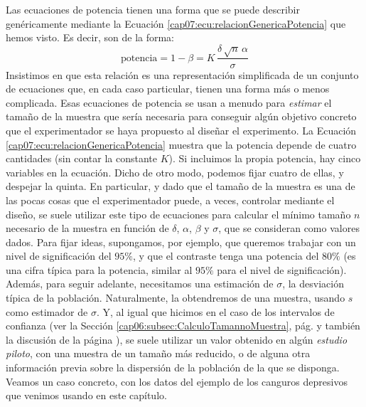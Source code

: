 Las ecuaciones de potencia tienen una forma que se puede describir genéricamente mediante la Ecuación \ref{cap07:ecu:relacionGenericaPotencia} que hemos visto. Es decir, son de la forma:
\[\mbox{potencia}=1-\beta = K\, \dfrac{\delta\,\sqrt{n}\,\alpha}{\sigma}\]
Insistimos en que esta relación es una representación simplificada de un conjunto de ecuaciones que, en cada caso particular, tienen una forma más o menos complicada. Esas ecuaciones de potencia se usan a menudo para {\em estimar} el tamaño de la muestra que sería necesaria para conseguir algún objetivo concreto que el experimentador se haya propuesto al diseñar el experimento. La Ecuación \ref{cap07:ecu:relacionGenericaPotencia} muestra que la potencia depende de cuatro cantidades (sin contar la constante $K$). Si incluimos la propia potencia, hay cinco variables en la ecuación. Dicho de otro modo, podemos fijar cuatro de ellas, y despejar la quinta. En particular, y dado que el tamaño de la muestra es una de las pocas cosas que el experimentador puede, a veces, controlar mediante el diseño, se suele utilizar este tipo de ecuaciones para calcular el mínimo tamaño $n$ necesario de la muestra en función de $\delta$, $\alpha$, $\beta$ y $\sigma$, que se consideran  como valores dados. Para fijar ideas, supongamos,  por ejemplo, que queremos trabajar con un nivel de significación del $95\%$, y que el contraste tenga una potencia del $80\%$ (es una cifra típica para la potencia, similar al $95\%$ para el nivel de significación). Además, para seguir adelante, necesitamos una estimación de $\sigma$, la  desviación típica de la población. Naturalmente, la obtendremos de una muestra, usando $s$ como estimador de $\sigma$. Y, al igual que hicimos en el caso de los intervalos de confianza (ver la Sección \ref{cap06:subsec:CalculoTamannoMuestra}, pág. \pageref{cap06:subsec:CalculoTamannoMuestra} y también la discusión de la página \pageref{cap06:subsubsec:DeterminacionTamannoMuestraParaMuConSigmaDesconocida}), se suele utilizar un valor obtenido en algún {\em estudio piloto}, con una muestra de un tamaño más reducido, o de alguna otra información previa sobre la dispersión de la población de la que se disponga.
Veamos un caso concreto, con los datos del ejemplo de los canguros depresivos que venimos usando en este capítulo.
